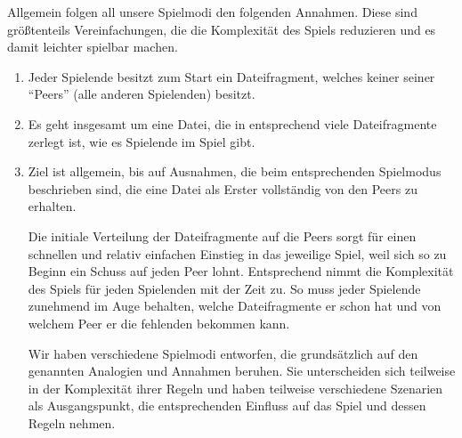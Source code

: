 Allgemein folgen all unsere Spielmodi den folgenden Annahmen. Diese sind größtenteils Vereinfachungen, die die Komplexität des Spiels reduzieren und es damit leichter spielbar machen.

\begin{enumerate}
\item Jeder Spielende besitzt zum Start ein Dateifragment, welches keiner seiner “Peers” (alle anderen Spielenden) besitzt.
\item Es geht insgesamt um eine Datei, die in entsprechend viele Dateifragmente zerlegt ist, wie es Spielende im Spiel gibt.
\item Ziel ist allgemein, bis auf Ausnahmen, die beim entsprechenden Spielmodus beschrieben sind, die eine Datei als Erster vollständig von den Peers zu erhalten.

Die initiale Verteilung der Dateifragmente auf die Peers sorgt für einen schnellen und relativ einfachen Einstieg in das jeweilige Spiel, weil sich so zu Beginn ein Schuss auf jeden Peer lohnt. Entsprechend nimmt die Komplexität des Spiels für jeden Spielenden mit der Zeit zu. So muss jeder Spielende zunehmend im Auge behalten, welche Dateifragmente er schon hat und von welchem Peer er die fehlenden bekommen kann.

Wir haben verschiedene Spielmodi entworfen, die grundsätzlich auf den genannten Analogien und Annahmen beruhen. Sie unterscheiden sich teilweise in der Komplexität ihrer Regeln und haben teilweise verschiedene Szenarien als Ausgangspunkt, die entsprechenden Einfluss auf das Spiel und dessen Regeln nehmen.
\end{enumerate}